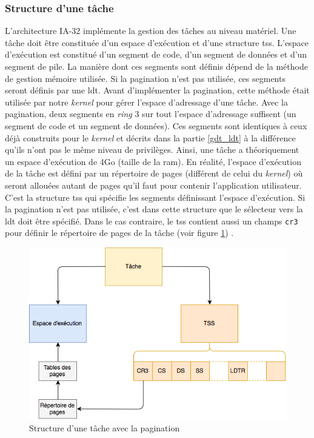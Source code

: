 \subsubsection{Structure d'une tâche}
L'architecture \acrshort{IA-32} implémente la gestion des tâches au niveau matériel.
Une tâche doit être constituée d'un espace d'exécution et d'une structure \acrshort{tss}.
L'espace d'exécution est constitué d'un segment de code, d'un segment de données
et d'un segment de pile. La manière dont ces segments sont définis dépend de la
méthode de gestion mémoire utilisée. Si la pagination n'est pas utilisée, ces segments
seront définis par une \acrshort{ldt}. Avant d'implémenter la pagination, cette
méthode était utilisée par notre \textit{kernel} pour gérer l'espace d'adressage
d'une tâche. Avec la pagination, deux segments en \textit{ring} 3 sur tout l'espace
d'adressage suffisent (un segment de code et un segment de données). Ces segments
sont identiques à ceux déjà construits pour le \textit{kernel} et décrits dans
la partie \ref{gdt_ldt} à la différence qu'ils n'ont pas le même niveau de privilèges.
Ainsi, une tâche a théoriquement un espace d'exécution de 4Go (taille de la \acrshort{ram}).
En réalité, l'espace d'exécution de la tâche est défini par un répertoire de pages
(différent de celui du \textit{kernel}) où seront allouées autant de pages qu'il faut
pour contenir l'application utilisateur. C'est la structure \acrshort{tss} qui spécifie
les segments définissant l'espace d'exécution. Si la pagination n'est pas utilisée,
c'est dans cette structure que le sélecteur vers la \acrshort{ldt} doit être spécifié.
Dans le cas contraire, le \acrshort{tss} contient aussi un champs \texttt{cr3}
pour définir le répertoire de pages de la tâche (voir figure \ref{task_exec_space})
\cite{ref66}.

\begin{figure}[!h]
  \centering
  \includegraphics[scale=.7]{images/task_exec_space.png}
  \caption{Structure d'une tâche avec la pagination}
  \label{task_exec_space}
\end{figure}

